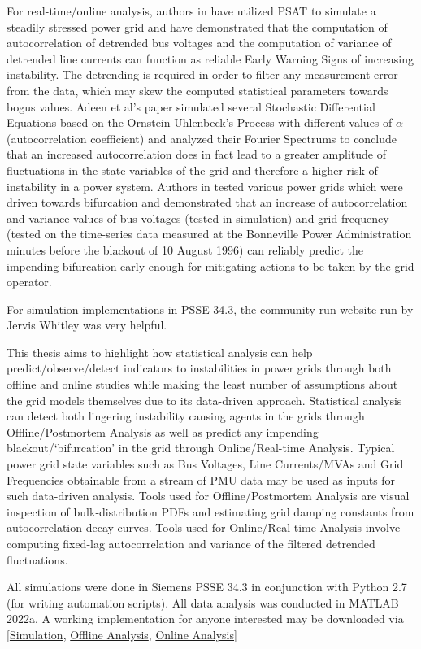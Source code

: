 For real-time/online analysis, authors in \cite{ghanvati01} have utilized PSAT \cite{psatMilano} to simulate a steadily stressed power grid and have demonstrated that the computation of autocorrelation of detrended bus voltages and the computation  of variance of detrended line currents can function as reliable Early Warning Signs of increasing instability. The detrending is required in order to filter any measurement error from the data, which may skew the computed statistical parameters towards bogus values. Adeen et al's paper \cite{adeen01} simulated several Stochastic Differential Equations based on the Ornstein-Uhlenbeck's Process with different values of $\alpha$ (autocorrelation coefficient) and analyzed their Fourier Spectrums to conclude that an increased autocorrelation does in fact lead to a greater amplitude of fluctuations in the state variables of the grid and therefore a higher risk of instability in a power system. Authors in \cite{sanchez01} tested various power grids which were driven towards bifurcation and demonstrated that an increase of autocorrelation and variance values of bus voltages (tested in simulation) and grid frequency (tested on the time-series data measured at the Bonneville Power Administration minutes before the blackout of 10 August 1996) can reliably predict the impending bifurcation early enough for mitigating actions to be taken by the grid operator.

For simulation implementations in PSSE 34.3, the community run website run by Jervis Whitley \cite{psspyWebsite} was very helpful.

This thesis aims to highlight how statistical analysis can help predict/observe/detect indicators to instabilities in power grids through both offline and online studies while making the least number of assumptions about the grid models themselves due to its data-driven approach. Statistical analysis can detect both lingering instability causing agents in the grids through Offline/Postmortem Analysis as well as predict any impending blackout/`bifurcation' in the grid through Online/Real-time Analysis. Typical power grid state variables such as Bus Voltages, Line Currents/MVAs and Grid Frequencies obtainable from a stream of PMU data may be used as inputs for such data-driven analysis. Tools used for Offline/Postmortem Analysis are visual inspection of bulk-distribution PDFs and estimating grid damping constants from autocorrelation decay curves. Tools used for Online/Real-time Analysis involve computing fixed-lag autocorrelation and variance of the filtered detrended fluctuations.

All simulations were done in Siemens PSSE 34.3 in conjunction with Python 2.7 (for writing automation scripts). All data analysis was conducted in MATLAB 2022a. A working implementation for anyone interested may be downloaded via [\href{https://t.ly/HwAT}{Simulation}, \href{https://t.ly/e1f9}{Offline Analysis}, \href{https://t.ly/u_Mp}{Online Analysis}]